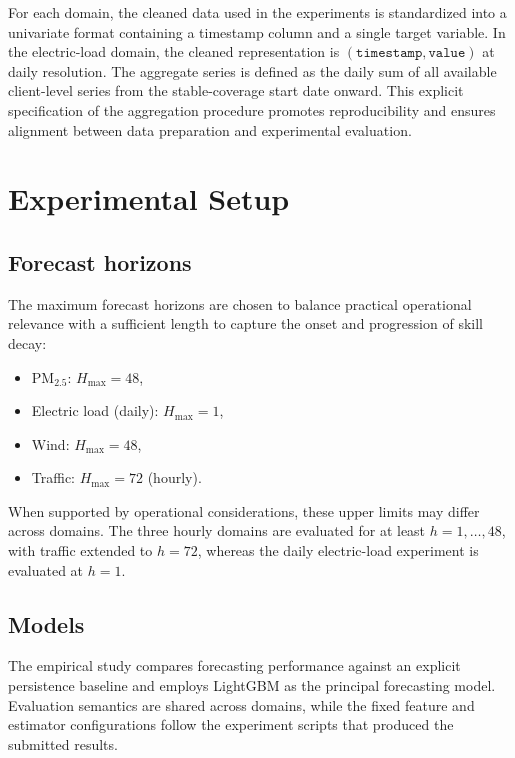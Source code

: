 \documentclass[pdflatex]{sn-jnl}
\begin{document}
For each domain, the cleaned data used in the experiments is
standardized into a univariate format containing a timestamp column and
a single target variable. In the electric-load domain, the cleaned
representation is $(\texttt{timestamp}, \texttt{value})$ at daily
resolution. The aggregate series is defined as the daily sum of all
available client-level series from the stable-coverage start date
onward. This explicit specification of the aggregation procedure
promotes reproducibility and ensures alignment between data preparation
and experimental evaluation.

\section{Experimental Setup}

\subsection{Forecast horizons}

The maximum forecast horizons are chosen to balance practical
operational relevance with a sufficient length to capture the onset and
progression of skill decay:
\begin{itemize}
  \item PM$_{2.5}$: $H_{\max}=48$,
  \item Electric load (daily): $H_{\max}=1$,
  \item Wind: $H_{\max}=48$,
  \item Traffic: $H_{\max}=72$ (hourly).
\end{itemize}
When supported by operational considerations, these upper limits may
differ across domains. The three hourly domains are evaluated for at least
$h=1,\ldots,48$, with traffic extended to $h=72$, whereas the daily
electric-load experiment is evaluated at $h=1$.

\subsection{Models}

The empirical study compares forecasting performance against an
explicit persistence baseline and employs LightGBM as the principal
forecasting model. Evaluation semantics are shared across domains, while
the fixed feature and estimator configurations follow the experiment
scripts that produced the submitted results.
\end{document}
